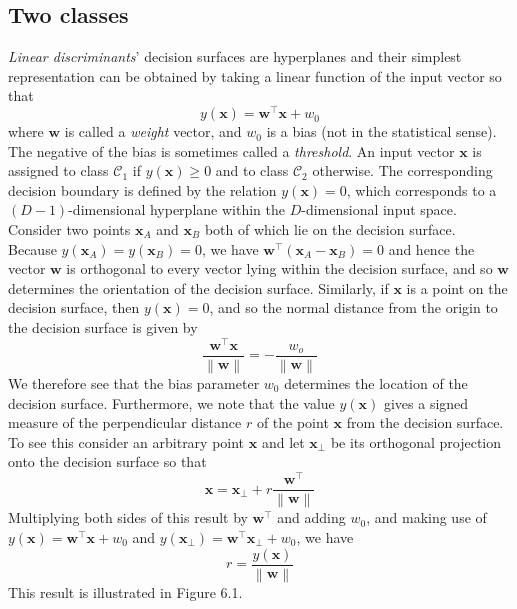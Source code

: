 \documentclass[twoside]{article}
\newcommand{\norm}[1]{\left\lVert #1 \right\rVert}
\begin{document}
\subsection{Two classes}
\textit{Linear discriminants}' decision surfaces are hyperplanes and their simplest representation can be obtained by taking a linear function of the input vector so that
\begin{equation*}
    y(\boldsymbol{x}) = \boldsymbol{w^\intercal x} + w_0
\end{equation*}
where $\boldsymbol{w}$ is called a \textit{weight} vector, and $w_0$ is a bias (not in the statistical sense). The negative of the bias is sometimes called a \textit{threshold}. An input vector $\boldsymbol{x}$ is assigned to class $\mathcal{C}_1$ if $y(\boldsymbol{x}) \geq 0$ and to class $\mathcal{C}_2$ otherwise. The corresponding decision boundary is defined by the relation $y(\boldsymbol{x}) = 0$, which corresponds to a $(D - 1)$-dimensional hyperplane within the $D$-dimensional input space. Consider two points $\boldsymbol{x}_A$ and $\boldsymbol{x}_B$ both of which lie on the decision surface.\\
Because $y(\boldsymbol{x}_A) = y(\boldsymbol{x}_B) = 0$, we have $\boldsymbol{w}^\intercal(\boldsymbol{x}_A- \boldsymbol{x}_B) = 0$ and hence the vector $\boldsymbol{w}$ is orthogonal to every vector lying within the decision surface, and so $\boldsymbol{w}$ determines the orientation of the decision surface. Similarly, if $\boldsymbol{x}$ is a point on the decision surface, then $y(\boldsymbol{x}) = 0$, and so the normal distance from the origin to the decision surface is given by
\begin{equation*}
    \frac{\boldsymbol{w^\intercal x}}{\norm{\boldsymbol{w}}} = - \frac{w_o}{\norm{\boldsymbol{w}}}
\end{equation*}
We therefore see that the bias parameter $w_0$ determines the location of the decision surface. Furthermore, we note that the value $y(\boldsymbol{x})$ gives a signed measure of the perpendicular distance $r$ of the point $\boldsymbol{x}$ from the decision surface. To see this consider an arbitrary point $\boldsymbol{x}$ and let $\boldsymbol{x}_\perp$ be its orthogonal projection onto the decision surface so that
\begin{equation*}
    \boldsymbol{x} = \boldsymbol{x}_\perp + r\frac{\boldsymbol{w^\intercal}}{\norm{\boldsymbol{w}}}
\end{equation*}
Multiplying both sides of this result by $\boldsymbol{w}^\intercal$ and adding $w_0$, and making use of $y(\boldsymbol{x}) = \boldsymbol{w^\intercal x} + w_0$ and $y(\boldsymbol{x}_\perp) = \boldsymbol{w^\intercal x}_\perp + w_0$, we have
\begin{equation*}
    r = \frac{y(\boldsymbol{x})}{\norm{\boldsymbol{w}}}
\end{equation*}
This result is illustrated in Figure 6.1.
\end{document}
